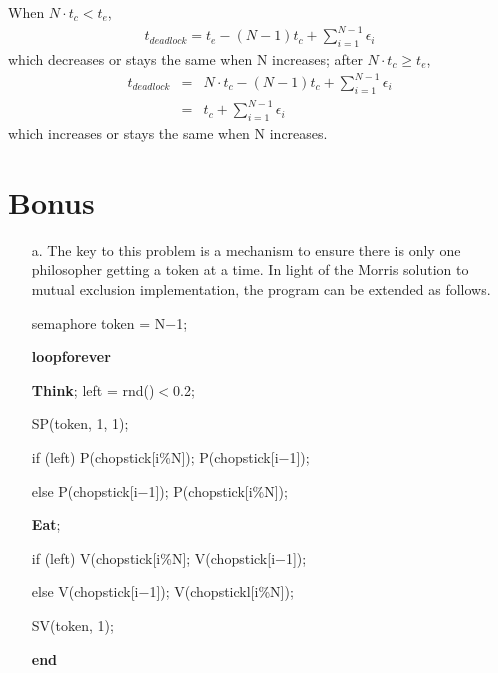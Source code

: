 \documentclass[12pt,letterpaper]{article}
\begin{document}
\begin{itemize}
When $N\cdot t_c<t_e$, 
\begin{align}
t_{deadlock} = t_e - (N-1)t_c + \sum^{N-1}_{i=1}\epsilon_i
\end{align}
which decreases or stays the same when N increases; after $N\cdot t_c\ge t_e$, 
\begin{align}
\nonumber t_{deadlock} & = & N\cdot t_c - (N-1)t_c + \sum^{N-1}_{i=1}\epsilon_i\\
& = & t_c+\sum^{N-1}_{i=1}\epsilon_i
\end{align}
which increases or stays the same when N increases.
\end{itemize}

\section*{Bonus}
\begin{itemize}
\item[a.] The key to this problem is a mechanism to ensure there is only one philosopher getting a token at a time. In light of the Morris solution to mutual exclusion implementation, the program can be extended as follows.

semaphore token = N$-$1;

\textbf{loopforever}

\hspace{3em}\textbf{Think}; left = rnd()$<$0.2;

\hspace{3em}SP(token, 1, 1);

\hspace{3em}if (left) P(chopstick[i\%N]); P(chopstick[i$-$1]);

\hspace{3em}else P(chopstick[i$-$1]); P(chopstick[i\%N]);

\hspace{3em}\textbf{Eat};

\hspace{3em}if (left) V(chopstick[i\%N]; V(chopstick[i$-$1]);

\hspace{3em}else V(chopstick[i$-$1]); V(chopstickl[i\%N]);

\hspace{3em}SV(token, 1);

\textbf{end}


\end{itemize}
\end{document}
